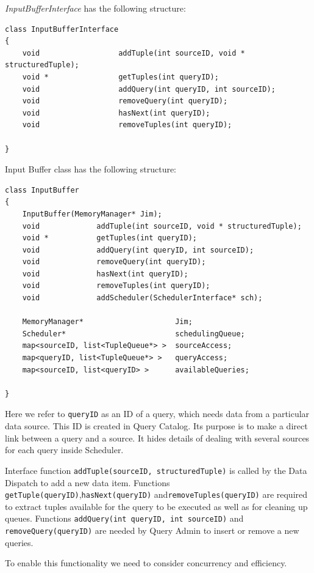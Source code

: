 \documentclass[14pt]{article}
\begin{document}
\noindent \emph{InputBufferInterface} has the following structure:

\begin{verbatim}
class InputBufferInterface
{
    void                  addTuple(int sourceID, void * structuredTuple);
    void *                getTuples(int queryID);
    void                  addQuery(int queryID, int sourceID);
    void                  removeQuery(int queryID);
    void                  hasNext(int queryID);
    void                  removeTuples(int queryID);
	
}
\end{verbatim}

\noindent Input Buffer class has the following structure:

\begin{verbatim}
class InputBuffer
{
	InputBuffer(MemoryManager* Jim);
    void             addTuple(int sourceID, void * structuredTuple);
    void *           getTuples(int queryID);
    void             addQuery(int queryID, int sourceID);
    void             removeQuery(int queryID);
    void             hasNext(int queryID);
    void             removeTuples(int queryID);
    void             addScheduler(SchedulerInterface* sch);

	MemoryManager*                     Jim;
	Scheduler*                         schedulingQueue;
	map<sourceID, list<TupleQueue*> >  sourceAccess;
	map<queryID, list<TupleQueue*> >   queryAccess;
	map<sourceID, list<queryID> >      availableQueries;
	
}
\end{verbatim}

\noindent Here we refer to {\tt queryID} as an ID of a query, which needs data from a particular data source. This ID is created in Query Catalog. Its purpose is to make a direct link between a query and a source. It hides details of dealing with several sources for each query inside Scheduler.

Interface function {\tt addTuple(sourceID, structuredTuple)} is called by the Data Dispatch to add a new data item. Functions {\tt getTuple(queryID)},{\tt hasNext(queryID)} and{\tt removeTuples(queryID)} are required to extract tuples available for the query to be executed as well as for cleaning up queues. Functions {\tt addQuery(int queryID, int sourceID)} and {\tt removeQuery(queryID)} are needed by Query Admin to insert or remove a new queries. 

To enable this functionality we need to consider concurrency and efficiency. 
\end{document}
